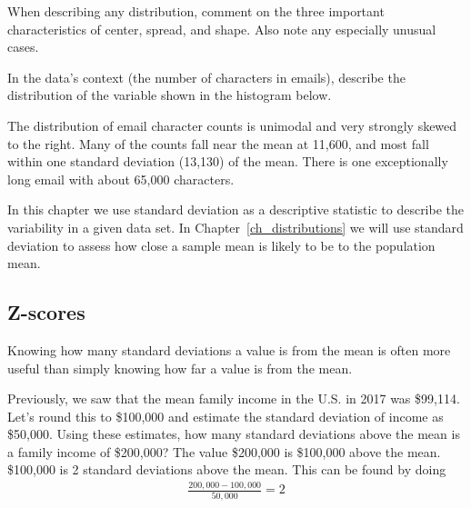 When describing any distribution, comment on the three important characteristics of center, spread, and shape. Also note any especially unusual cases.


\begin{examplewrap}
\begin{nexample}{In the data's context (the number of characters in emails), describe the distribution of the  variable shown in the histogram below.
  \begin{center}
  \end{center}}
The distribution of email character counts is unimodal and very strongly skewed to the right. Many of the counts fall near the mean at 11,600, and most fall within one standard deviation (13,130) of the mean. There is one exceptionally long email with about 65,000 characters.



\end{nexample}
\end{examplewrap}

In this chapter we use standard deviation as a descriptive statistic to describe the variability in a given data set. In Chapter~\ref{ch_distributions} we will use standard deviation to assess how close a sample mean is likely to be to the population mean.


\D{\newpage}

\subsection{Z-scores}
\label{zscores}


Knowing how many standard deviations a value is from the mean is often more useful than simply knowing how far a value is from the mean.

\begin{examplewrap}
\begin{nexample}
{Previously, we saw that the mean family income in the U.S. in 2017 was \$99,114. Let's round this to \$100,000 and estimate the standard deviation of income as \$50,000.  Using these estimates, how many standard deviations above the mean is a family income of \$200,000?  }
The value \$200,000 is \$100,000 above the mean.  \$100,000 is 2 standard deviations above the mean.  This can be found by doing
  \begin{align*}
  \frac{200,000 - 100,000}{50,000} = 2
  \end{align*}
\end{nexample}
\end{examplewrap}

